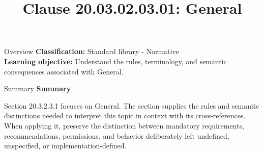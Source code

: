 \documentclass[10pt,letterpaper]{article}
\title{Clause 20.03.02.03.01: General}
\author{}
\date{}
\begin{document}
\maketitle
\begin{CornellOverviewBox}{Overview}
\textbf{Classification:} Standard library - Normative\\[2pt]
\textbf{Learning objective:} Understand the rules, terminology, and semantic consequences associated with General.
\end{CornellOverviewBox}\begin{CornellSummaryBox}{Summary}
{\sffamily\bfseries\color{Accent} Summary}\par\vspace{3pt}Section 20.3.2.3.1 focuses on General. The section supplies the rules and semantic distinctions needed to interpret this topic in context with its cross-references. When applying it, preserve the distinction between mandatory requirements, recommendations, permissions, and behavior deliberately left undefined, unspecified, or implementation-defined.
\end{CornellSummaryBox}
\end{document}
